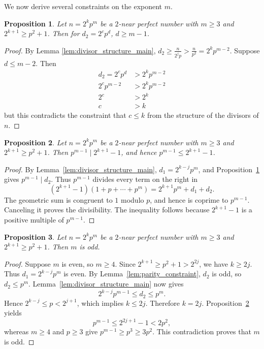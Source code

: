 \documentclass[10pt]{article}
\newtheorem{proposition}{Proposition}
\theoremstyle{definition}
\begin{document}
We now derive several constraints on the exponent $m$.

\begin{proposition}\label{prop:d_bound}
Let $n=2^kp^m$ be a $2$-near perfect number with $m\geq 3$ and $2^{k+1}\geq p^2+1$. Then for $d_2 = 2^cp^d$,  $d \geq m-1$.
\end{proposition}

\begin{proof}
By Lemma \ref{lem:divisor_structure_main}, $d_2 \geq \frac{n}{2^jp} > \frac{n}{p^2} = 2^kp^{m-2}$. Suppose $d \leq m-2$. Then
\begin{align*}
    d_2 = 2^cp^d &> 2^kp^{m-2}\\
    2^cp^{m-2} &> 2^kp^{m-2}\\
    2^c &> 2^k\\
    c &> k
\end{align*}
but this contradicts the constraint that $c \leq k$ from the structure of the divisors of $n$.
\end{proof}

\begin{proposition}\label{prop:prime_power_divisibility}
Let $n=2^kp^m$ be a $2$-near perfect number with $m\geq 3$ and $2^{k+1}\geq p^2+1$. Then $p^{m-1}\mid 2^{k+1}-1$, and hence $p^{m-1} \leq 2^{k+1}-1$.
\end{proposition}

\begin{proof}
By Lemma~\ref{lem:divisor_structure_main}, $d_1=2^{k-j}p^m$,
and Proposition~\ref{prop:d_bound} gives $p^{m-1}\mid d_2$.
Thus $p^{m-1}$ divides every term on the right in
\[
(2^{k+1}-1)(1+p+\cdots+p^m)=2^{k+1}p^m+d_1+d_2.
\]
The geometric sum is congruent to $1$ modulo $p$, and hence is
coprime to $p^{m-1}$. Canceling it proves the divisibility. The inequality follows because $2^{k+1}-1$ is a positive multiple of $p^{m-1}$.
\end{proof}

\begin{proposition}\label{prop:m_odd}
Let $n=2^kp^m$ be a $2$-near perfect number with $m\geq 3$ and $2^{k+1}\geq p^2+1$. Then $m$ is odd.
\end{proposition}

\begin{proof}
Suppose $m$ is even, so $m\ge4$. Since
$2^{k+1}\ge p^2+1>2^{2j}$, we have $k\ge2j$.
Thus $d_1=2^{k-j}p^m$ is even. By Lemma~\ref{lem:parity_constraint},
$d_2$ is odd, so $d_2\le p^m$. Lemma~\ref{lem:divisor_structure_main}
now gives
\[
2^{k-j}p^{m-1}\le d_2\le p^m.
\]
Hence $2^{k-j}\le p<2^{j+1}$, which implies $k\le2j$.
Therefore $k=2j$. Proposition~\ref{prop:prime_power_divisibility} yields
\[
p^{m-1}\le2^{2j+1}-1<2p^2,
\]
whereas $m\ge4$ and $p\ge3$ give $p^{m-1}\ge p^3\ge3p^2$.
This contradiction proves that $m$ is odd.
\end{proof}
\end{document}
